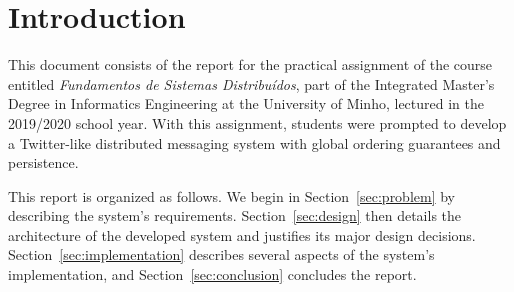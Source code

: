 
\section{Introduction}
\label{sec:introduction}

This document consists of the report for the practical assignment of the course entitled \emph{Fundamentos de Sistemas Distribuídos}, part of the Integrated Master's Degree in Informatics Engineering at the University of Minho, lectured in the 2019/2020 school year.
With this assignment, students were prompted to develop a Twitter-like distributed messaging system with global ordering guarantees and persistence.

This report is organized as follows. We begin in Section~\ref{sec:problem} by describing the system's requirements.
Section~\ref{sec:design} then details the architecture of the developed system and justifies its major design decisions. Section~\ref{sec:implementation} describes several aspects of the system's implementation, and Section~\ref{sec:conclusion} concludes the report.

